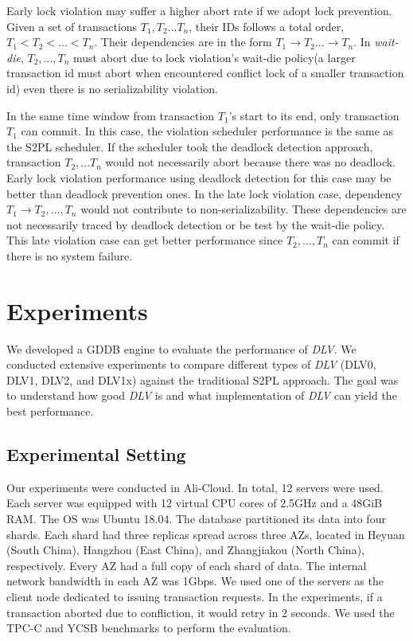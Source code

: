 \documentclass[conference]{IEEEtran}
\begin{document}
Early lock violation may suffer a higher abort rate if we adopt lock prevention.
Given a set of transactions ${T_1, T_2... T_n}$, their IDs follows a total order, ${T_1 < T_2 < ... < T_n}$.
Their dependencies are in the form ${T_1 \rightarrow T_2 ... \rightarrow T_n}$.
In \emph{wait-die}, ${T_2, ..., T_n}$ must abort due to lock violation's wait-die policy(a larger transaction id must abort when encountered conflict lock of a smaller transaction id) even there is no serializability violation.

In the same time window from transaction ${T_1}$'s start to its end, only transaction ${T_1}$ can commit.
In this case, the violation scheduler performance is the same as the S2PL scheduler.
If the scheduler took the deadlock detection approach, transaction ${T_2, ... T_n}$ would not necessarily abort because there was no deadlock.
Early lock violation performance using deadlock detection for this case may be better than deadlock prevention ones.
In the late lock violation case, dependency ${T_1 \rightarrow T_2 , ... ,T_n}$ would not contribute to non-serializability.
These dependencies are not necessarily traced by deadlock detection or be test by the wait-die policy.
This late violation case can get better performance since ${T_2,..., T_n}$ can commit if there is no system failure.

\section{Experiments}
\label{sec:experiment}
We developed a GDDB engine to evaluate the performance of \emph{DLV}.
We conducted extensive experiments to compare different types of \emph{DLV} (DLV0, DLV1, DLV2, and DLV1x) against the traditional S2PL approach.
The goal was to understand how good \emph{DLV} is and what implementation of \emph{DLV} can yield the best performance. 

\subsection{Experimental Setting}
\label{subsec:exp_setting}

Our experiments were conducted in Ali-Cloud.
In total, 12 servers were used.
Each server was equipped with 12 virtual CPU cores of 2.5GHz and a 48GiB RAM.
The OS was Ubuntu 18.04.
The database partitioned its data into four shards.
Each shard had three replicas spread across three AZs,
located in Heyuan (South China), Hangzhou (East China), and Zhangjiakou (North China), respectively.
Every AZ had a full copy of each shard of data.
The internal network bandwidth in each AZ was 1Gbps.
We used one of the servers as the client node dedicated to issuing transaction requests.
In the experiments, if a transaction aborted due to confliction, it would retry in 2 seconds.
We used the TPC-C and YCSB benchmarks to perform the evaluation.
\end{document}
